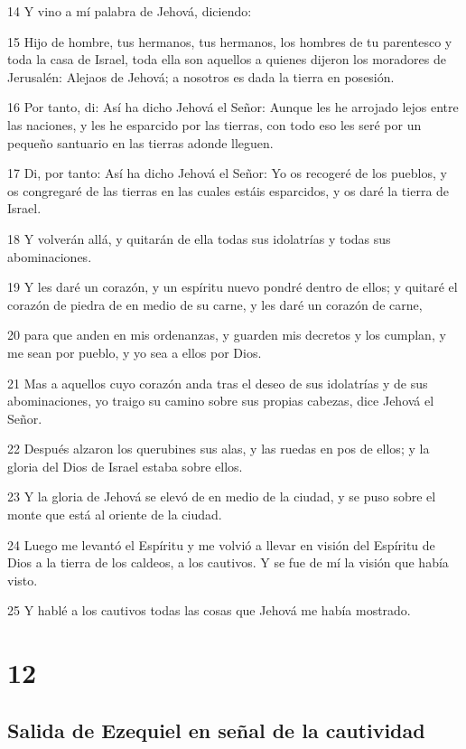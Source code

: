 \par 14 Y vino a mí palabra de Jehová, diciendo:
\par 15 Hijo de hombre, tus hermanos, tus hermanos, los hombres de tu parentesco y toda la casa de Israel, toda ella son aquellos a quienes dijeron los moradores de Jerusalén: Alejaos de Jehová; a nosotros es dada la tierra en posesión.
\par 16 Por tanto, di: Así ha dicho Jehová el Señor: Aunque les he arrojado lejos entre las naciones, y les he esparcido por las tierras, con todo eso les seré por un pequeño santuario en las tierras adonde lleguen.
\par 17 Di, por tanto: Así ha dicho Jehová el Señor: Yo os recogeré de los pueblos, y os congregaré de las tierras en las cuales estáis esparcidos, y os daré la tierra de Israel.
\par 18 Y volverán allá, y quitarán de ella todas sus idolatrías y todas sus abominaciones.
\par 19 Y les daré un corazón, y un espíritu nuevo pondré dentro de ellos; y quitaré el corazón de piedra de en medio de su carne, y les daré un corazón de carne,
\par 20 para que anden en mis ordenanzas, y guarden mis decretos y los cumplan, y me sean por pueblo, y yo sea a ellos por Dios. 
\par 21 Mas a aquellos cuyo corazón anda tras el deseo de sus idolatrías y de sus abominaciones, yo traigo su camino sobre sus propias cabezas, dice Jehová el Señor.
\par 22 Después alzaron los querubines sus alas, y las ruedas en pos de ellos; y la gloria del Dios de Israel estaba sobre ellos.
\par 23 Y la gloria de Jehová se elevó de en medio de la ciudad, y se puso sobre el monte que está al oriente de la ciudad. 
\par 24 Luego me levantó el Espíritu y me volvió a llevar en visión del Espíritu de Dios a la tierra de los caldeos, a los cautivos. Y se fue de mí la visión que había visto.
\par 25 Y hablé a los cautivos todas las cosas que Jehová me había mostrado.

\chapter{12}

\section*{Salida de Ezequiel en señal de la cautividad}

